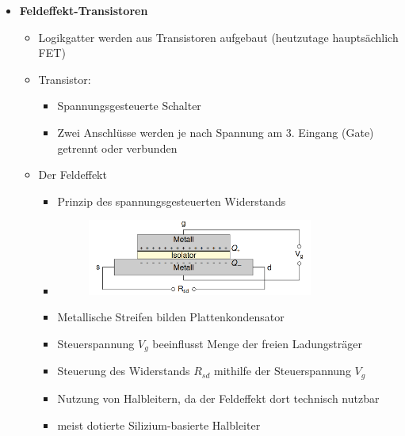 \documentclass[11pt,a4paper]{article}
\begin{document}
\begin{itemize}
\item \textbf{Feldeffekt-Transistoren}
	\begin{itemize}
	\item Logikgatter werden aus Transistoren aufgebaut (heutzutage hauptsächlich FET)
	\item Transistor: 
		\begin{itemize}
		\item Spannungsgesteuerte Schalter
		\item Zwei Anschlüsse werden je nach Spannung am 3. Eingang (Gate) getrennt oder verbunden
		\end{itemize}			
	\item Der Feldeffekt
		\begin{itemize}
		\item Prinzip des spannungsgesteuerten Widerstands
		\item[] \begin{figure}[H]
				\begin{center}
				\includegraphics[height=2.5cm]{Bilder/feldeffekt}
				\end{center}
				\end{figure}
		\item Metallische Streifen bilden Plattenkondensator
		\item Steuerspannung $V_g$ beeinflusst Menge der freien Ladungsträger
		\item Steuerung des Widerstands $R_{sd}$ mithilfe der Steuerspannung $V_g$ 
		\item Nutzung von Halbleitern, da der Feldeffekt dort technisch nutzbar
		\item meist dotierte Silizium-basierte Halbleiter
		\end{itemize}
		

\end{itemize}
\end{itemize}
\end{document}
